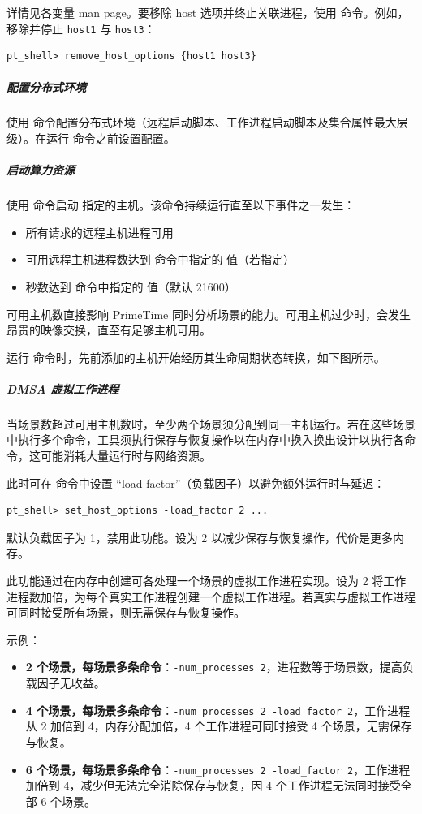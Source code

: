 详情见各变量 man page。要移除 host 选项并终止关联进程，使用
 命令。例如，移除并停止 \texttt{host1} 与
\texttt{host3}：
\begin{lstlisting}
pt_shell> remove_host_options {host1 host3}
\end{lstlisting}

\subparagraph{配置分布式环境}
使用  命令配置分布式环境（远程启动脚本、工作进程启动脚本及集合属性最大层级）。在运行  命令之前设置配置。

\subparagraph{启动算力资源}
使用  命令启动  指定的主机。该命令持续运行直至以下事件之一发生：
\begin{itemize}
  \item 所有请求的远程主机进程可用
  \item 可用远程主机进程数达到  命令中指定的  值（若指定）
  \item 秒数达到  命令中指定的  值（默认 21600）
\end{itemize}

可用主机数直接影响 PrimeTime 同时分析场景的能力。可用主机过少时，会发生昂贵的映像交换，直至有足够主机可用。

运行  命令时，先前添加的主机开始经历其生命周期状态转换，如下图所示。


\subparagraph{DMSA 虚拟工作进程}
当场景数超过可用主机数时，至少两个场景须分配到同一主机运行。若在这些场景中执行多个命令，工具须执行保存与恢复操作以在内存中换入换出设计以执行各命令，这可能消耗大量运行时与网络资源。

此时可在  命令中设置 ``load factor''（负载因子）以避免额外运行时与延迟：
\begin{lstlisting}
pt_shell> set_host_options -load_factor 2 ...
\end{lstlisting}
默认负载因子为 1，禁用此功能。设为 2 以减少保存与恢复操作，代价是更多内存。

此功能通过在内存中创建可各处理一个场景的虚拟工作进程实现。设为 2 将工作进程数加倍，为每个真实工作进程创建一个虚拟工作进程。若真实与虚拟工作进程可同时接受所有场景，则无需保存与恢复操作。

示例：
\begin{itemize}
  \item \textbf{2 个场景，每场景多条命令}：\texttt{-num\_processes 2}，进程数等于场景数，提高负载因子无收益。
  \item \textbf{4 个场景，每场景多条命令}：\texttt{-num\_processes 2 -load\_factor 2}，工作进程从 2 加倍到 4，内存分配加倍，4 个工作进程可同时接受 4 个场景，无需保存与恢复。
  \item \textbf{6 个场景，每场景多条命令}：\texttt{-num\_processes 2 -load\_factor 2}，工作进程加倍到 4，减少但无法完全消除保存与恢复，因 4 个工作进程无法同时接受全部 6 个场景。
\end{itemize}


